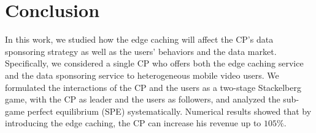 \documentclass[10 pt, conference]{IEEEtran}
\begin{document}



%







%

\section{Conclusion}



In this work, we studied how the edge caching will affect the CP's data sponsoring strategy as well as the users' behaviors and the data market.
Specifically, we considered a single CP who offers both the edge caching service and the data sponsoring service to heterogeneous mobile video users.
We formulated the interactions of the CP and the users as a two-stage Stackelberg game, with the CP as leader and the users as followers, and analyzed the sub-game perfect equilibrium (SPE) systematically.
Numerical results showed that by introducing the edge caching, the CP can increase his revenue up to $105\%$.




%
\end{document}
